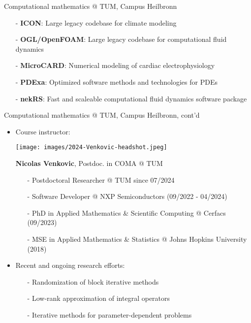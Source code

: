 \documentclass[t,usepdftitle=false]{beamer}
\begin{document}
\begin{frame}{Computational mathematics @ TUM, Campus Heilbronn}
\begin{itemize}
\begin{itemize}
\item[-] \textbf{ICON}: Large legacy codebase for climate modeling\vspace{.05cm}
\item[-] \textbf{OGL/OpenFOAM}: Large legacy codebase for computational fluid dynamics\vspace{.05cm}
\item[-] \textbf{MicroCARD}: Numerical modeling of cardiac electrophysiology\vspace{.05cm}
\item[-] \textbf{PDExa}: Optimized software methods and technologies for PDEs\vspace{.05cm}
\item[-] \textbf{nekRS}: Fast and scaleable computational fluid dynamics software package
\end{itemize}
\end{itemize}
\end{frame}

\begin{frame}{Computational mathematics @ TUM, Campus Heilbronn, cont'd}
\begin{itemize}
\item Course instructor:
\begin{center}\texttt{[image: images/2024-Venkovic-headshot.jpeg]}\end{center}\vspace{.15cm}
\textbf{Nicolas Venkovic}, Postdoc. in COMA @ TUM%
\begin{itemize}
\item[-] Postdoctoral Researcher @ TUM since 07/2024\vspace{.07cm}
\item[-] Software Developer @ NXP Semiconductors (09/2022 - 04/2024)\vspace{.07cm}
\item[-] PhD in Applied Mathematics \& Scientific Computing @ Cerfacs (09/2023)\vspace{.07cm}
\item[-] MSE in Applied Mathematics \& Statistics @ Johns Hopkins University (2018)\vspace{.07cm}
\end{itemize}
\item Recent and ongoing research efforts:
\begin{itemize}
\item[-] Randomization of block iterative methods\vspace{.07cm}
\item[-] Low-rank approximation of integral operators\vspace{.07cm}
\item[-] Iterative methods for parameter-dependent problems
\end{itemize}
\end{itemize}
\end{frame}
\end{document}

